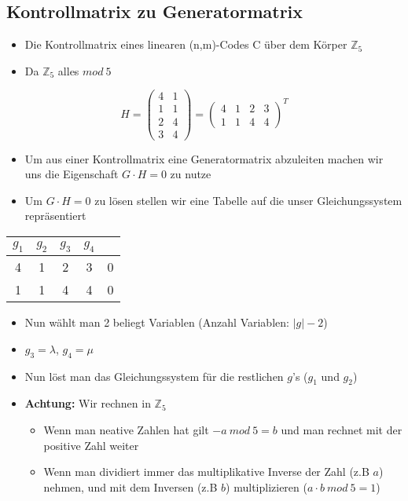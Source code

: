 \subsection{Kontrollmatrix zu Generatormatrix}

\begin{itemize}
\item Die Kontrollmatrix eines linearen (n,m)-Codes C über dem Körper $\mathbb{Z}_5$
\item Da $\mathbb{Z}_5$ alles $mod \ 5$
\end{itemize}

$$
H = \begin{pmatrix}
4 & 1\\
1 & 1\\
2 & 4\\
3 & 4
\end{pmatrix} = \begin{pmatrix}
4 & 1 & 2 & 3\\
1 & 1 & 4 & 4
\end{pmatrix}^T
$$

\begin{itemize}
\item Um aus einer Kontrollmatrix eine Generatormatrix abzuleiten machen wir uns die Eigenschaft $G\cdot H = 0$ zu nutze
\item Um $G\cdot H = 0$ zu lösen stellen wir eine Tabelle auf die unser Gleichungssystem repräsentiert
\end{itemize}

\begin{table}[h]
\centering
\begin{tabular}{cccc|c}
$g_1$ & $g_2$ & $g_3$ & $g_4$ &\\
\hline
4 & 1 & 2 & 3 & 0\\
1 & 1 & 4 & 4 & 0
\end{tabular}
\end{table}

\begin{itemize}
\item Nun wählt man 2 beliegt Variablen (Anzahl Variablen: $|g| - 2$)
\item $g_3 = \lambda$, $g_4 = \mu$
\item Nun löst man das Gleichungssystem für die restlichen $g$'s ($g_1$ und $g_2$)
\item \textbf{Achtung:} Wir rechnen in $\mathbb{Z}_5$
\begin{itemize}
\item Wenn man neative Zahlen hat gilt $-a \ mod \ 5 = b$ und man rechnet mit der positive Zahl weiter
\item Wenn man dividiert immer das multiplikative Inverse der Zahl (z.B $a$) nehmen, und mit dem Inversen (z.B $b$) multiplizieren ($a \cdot b \ mod  \ 5 = 1$)
\end{itemize}
\end{itemize}

